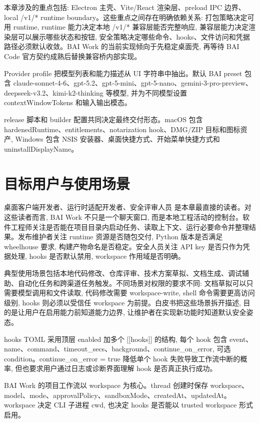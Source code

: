 本章涉及的重点包括: Electron 主壳、Vite/React 渲染层、preload IPC 边界、local /v1/* runtime boundary。这些重点之间存在明确依赖关系: 打包策略决定可用 runtime, runtime 能力决定本地 /v1/* 兼容层能否完整响应, 兼容层能力决定渲染层可以展示哪些状态和按钮, 安全策略决定哪些命令、hooks、文件访问和凭据路径必须默认收敛。BAI Work 的当前实现倾向于先稳定桌面壳, 再等待 BAI Code 官方契约成熟后替换兼容桥内部实现。

Provider profile 把模型列表和能力描述从 UI 字符串中抽出。默认 BAI preset 包含 claude-sonnet-4-6、gpt-5.2、gpt-5-mini、gpt-5-nano、gemini-3-pro-preview、deepseek-v3.2、kimi-k2-thinking 等模型, 并为不同模型设置 contextWindowTokens 和输入输出模态。

release 脚本和 builder 配置共同决定最终交付形态。macOS 包含 hardenedRuntime、entitlements、notarization hook、DMG/ZIP 目标和图标资产, Windows 包含 NSIS 安装器、桌面快捷方式、开始菜单快捷方式和 uninstallDisplayName。

\section{目标用户与使用场景}
桌面客户端开发者、运行时适配开发者、安全评审人员 是本章最直接的读者。对这些读者而言, BAI Work 不只是一个聊天窗口, 而是本地工程活动的控制台。软件工程师关注是否能在项目目录内启动任务、读取上下文、运行必要命令并整理结果。发布维护者关注 runtime 资源是否随包交付, Python 版本是否满足 wheelhouse 要求, 构建产物命名是否稳定。安全人员关注 API key 是否只作为凭据处理, hooks 是否默认禁用, workspace 作用域是否明确。

典型使用场景包括本地代码修改、仓库评审、技术方案草拟、文档生成、调试辅助、自动化任务和跨渠道任务触发。不同场景对权限的要求不同: 文档草拟可以只需要模型调用和文件读取, 代码修改需要 workspace-write, shell 命令需要更高访问级别, hooks 则必须以受信任 workspace 为前提。白皮书把这些场景拆开描述, 目的是让用户在启用能力前知道能力边界, 让维护者在实现新功能时知道默认安全姿态。

hooks TOML 采用顶层 enabled 加多个 [[hooks]] 的结构, 每个 hook 包含 event、name、command、timeout\_secs、background、continue\_on\_error, 可选 condition。continue\_on\_error = true 降低单个 hook 失败导致工作流中断的概率, 但也要求用户通过日志或诊断界面理解 hook 是否真正执行成功。

BAI Work 的项目工作流以 workspace 为核心。thread 创建时保存 workspace、model、mode、approvalPolicy、sandboxMode、createdAt、updatedAt。workspace 决定 CLI 子进程 cwd, 也决定 hooks 是否能以 trusted workspace 形式启用。

